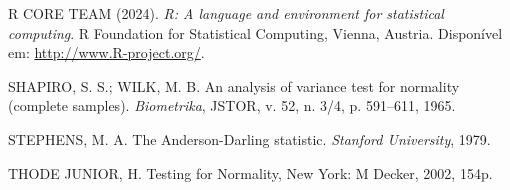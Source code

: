 \documentclass[a4paper,11pt]{article} %
\begin{document}
\begin{flushleft}
\noindent R CORE TEAM (2024). {\it R: A language and environment for statistical computing}. R Foundation for Statistical Computing, Vienna, Austria. Disponível em: \url{http://www.R-project.org/}.\newline

\noindent SHAPIRO, S. S.; WILK, M. B. An analysis of variance test for normality (complete samples). {\it Biometrika}, JSTOR, v. 52, n. 3/4, p. 591–611, 1965.\newline
    
\noindent STEPHENS, M. A. The Anderson-Darling statistic. {\it Stanford University}, 1979.\newline

\noindent THODE JUNIOR, H. Testing for Normality, New York: M Decker, 2002, 154p.


\end{flushleft}

	
	
	
\end{document}
